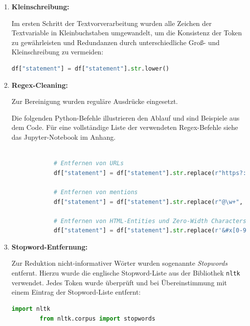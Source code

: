 \begin{enumerate}
    \item \textbf{Kleinschreibung:}
    
    Im ersten Schritt der Textvorverarbeitung wurden alle Zeichen der Textvariable in Kleinbuchstaben umgewandelt, um die Konsistenz der Token zu gewährleisten und Redundanzen durch unterschiedliche Groß- und Kleinschreibung zu vermeiden:
        \begin{lstlisting}[language=Python, caption={Umwandlung in Kleinschreibung}]
        df["statement"] = df["statement"].str.lower()
        \end{lstlisting}

    \item \textbf{Regex-Cleaning:}
    
    Zur Bereinigung wurden reguläre Ausdrücke eingesetzt.
    
    Die folgenden Python-Befehle illustrieren den Ablauf und sind Beispiele aus dem Code. Für eine vollständige Liste der verwendeten Regex-Befehle siehe das Jupyter-Notebook im Anhang.

        \begin{lstlisting}[language=Python, caption={Regex-Cleaning der Social-Media-Texte}]
        
            # Entfernen von URLs
            df["statement"] = df["statement"].str.replace(r"https?://\S+|www\.\S+", "", regex=True)

            # Entfernen von mentions
            df["statement"] = df["statement"].str.replace(r"@\w+", "", regex=True)

            # Entfernen von HTML-Entities und Zero-Width Characters (z.B., "&#x27;", "\u200b")
            df["statement"] = df["statement"].str.replace(r'&#x[0-9a-fA-F]+;|\u200b', '', regex=True)
        \end{lstlisting}

    \item \textbf{Stopword-Entfernung:}

Zur Reduktion nicht-informativer Wörter wurden sogenannte \textit{Stopwords} entfernt. Hierzu wurde die englische Stopword-Liste aus der Bibliothek \texttt{nltk} verwendet. Jedes Token wurde überprüft und bei Übereinstimmung mit einem Eintrag der Stopword-Liste entfernt:

    \begin{lstlisting}[language=Python, caption={Entfernung englischer Stopwords mit nltk}]
        import nltk
        from nltk.corpus import stopwords


\end{lstlisting}
\end{enumerate}
